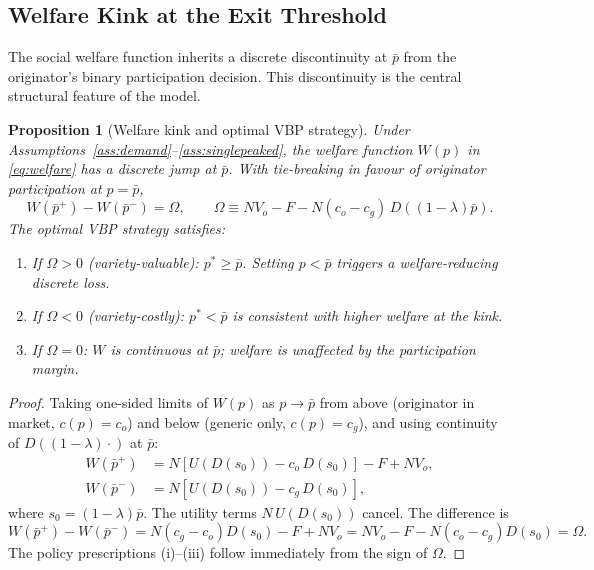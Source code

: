 \documentclass[12pt]{article}
\theoremstyle{plain}
\newtheorem{proposition}{Proposition}
\theoremstyle{definition}
\theoremstyle{remark}
\newcommand{\pbar}{\bar{p}}
\newcommand{\1}{\mathbf{1}}
\begin{document}
\subsection{Welfare Kink at the Exit Threshold}

The social welfare function inherits a discrete discontinuity at $\pbar$ from the originator's binary participation decision. This discontinuity is the central structural feature of the model.

\begin{proposition}[Welfare kink and optimal VBP strategy]
\label{prop:kink}
Under Assumptions~\ref{ass:demand}--\ref{ass:singlepeaked}, the welfare function $W(p)$ in \eqref{eq:welfare} has a discrete jump at $\pbar$. With tie-breaking in favour of originator participation at $p = \pbar$,
\begin{equation}
W(\pbar^+) - W(\pbar^-) = \Omega, \qquad \Omega \equiv N V_o - F - N(c_o - c_g)\,D\!\left((1-\lambda)\pbar\right).
\label{eq:omega}
\end{equation}
The optimal VBP strategy satisfies:
\begin{enumerate}
\item[(i)] If $\Omega > 0$ (variety-valuable): $p^* \geq \pbar$. Setting $p < \pbar$ triggers a welfare-reducing discrete loss.
\item[(ii)] If $\Omega < 0$ (variety-costly): $p^* < \pbar$ is consistent with higher welfare at the kink.
\item[(iii)] If $\Omega = 0$: $W$ is continuous at $\pbar$; welfare is unaffected by the participation margin.
\end{enumerate}
\end{proposition}

\begin{proof}
Taking one-sided limits of $W(p)$ as $p \to \pbar$ from above (originator in market, $c(p) = c_o$) and below (generic only, $c(p) = c_g$), and using continuity of $D((1-\lambda)\cdot)$ at $\pbar$:
\begin{align*}
W(\pbar^+) &= N\!\left[U(D(s_0)) - c_o\,D(s_0)\right] - F + NV_o, \\
W(\pbar^-) &= N\!\left[U(D(s_0)) - c_g\,D(s_0)\right],
\end{align*}
where $s_0 = (1-\lambda)\pbar$. The utility terms $N\,U(D(s_0))$ cancel. The difference is
$$W(\pbar^+) - W(\pbar^-) = N(c_g - c_o)D(s_0) - F + NV_o = NV_o - F - N(c_o-c_g)D(s_0) = \Omega.$$
The policy prescriptions (i)--(iii) follow immediately from the sign of $\Omega$.
\end{proof}
\end{document}
